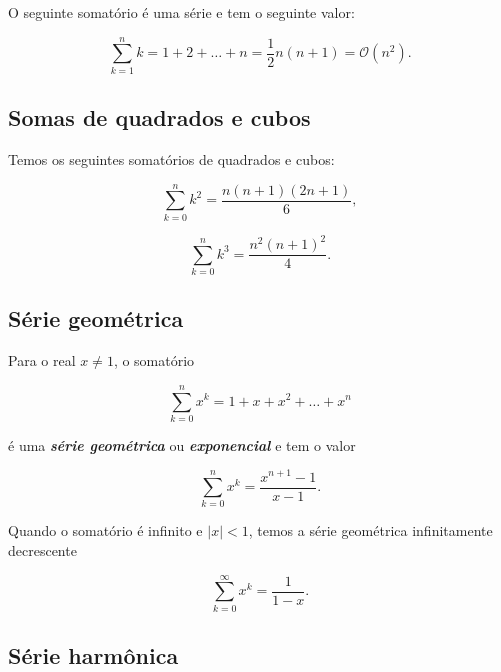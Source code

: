 \documentclass[a4paper,11pt,fleqn]{article}
\begin{document}
O seguinte somatório é uma série e tem o seguinte valor:

\begin{equation}
\sum\limits_{k=1}^{n}k = 1 + 2 + \ldots + n = \frac{1}{2} n(n + 1) = \mathcal{O} (n^{2}).
\end{equation}

\subsection{Somas de quadrados e cubos}

Temos os seguintes somatórios de quadrados e cubos:

\begin{equation}
\sum\limits_{k=0}^{n}k^{2} = \frac{n(n+1)(2n+1)}{6},
\end{equation}

\begin{equation}
\sum\limits_{k=0}^{n}k^{3} = \frac{n^{2}(n+1)^{2}}{4}.
\end{equation}

\subsection{Série geométrica}

Para o real $x \neq 1$, o somatório

\[ \sum\limits_{k=0}^{n}x^{k} = 1 + x + x^{2} + \ldots + x^{n} \]

é uma \textbf{\textit{série geométrica}} ou \textbf{\textit{exponencial}} e tem o valor

\begin{equation}
\sum\limits_{k=0}^{n}x^{k} = \frac{x^{n+1} - 1}{x - 1}.
\end{equation}

Quando o somatório é infinito e $|x|<1$, temos a série geométrica infinitamente decrescente

\begin{equation}
\sum\limits_{k=0}^{\infty}x^{k} = \frac{1}{1-x}.
\end{equation}

\subsection{Série harmônica}
\end{document}
